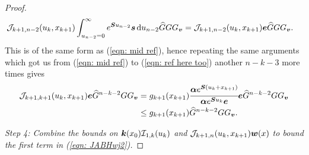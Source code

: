 \begin{proof}
	\begin{align}
		\mathcal J_{k+1,n-2}(u_k,x_{k+1}) \int_{u_{n-2}=0}^\infty e^{\boldsymbol{S}u_{n-2}}\boldsymbol s \, \mathrm{d} u_{n-2} \widehat G G G_{\boldsymbol v}
		&= \mathcal J_{k+1,n-2}(u_k,x_{k+1}) \boldsymbol e \widehat G G G_{\boldsymbol v}. \label{eqn: ref here too}
	\end{align} 
	This is of the same form as (\ref{eqn: mid ref}), hence repeating the same arguments which got us from (\ref{eqn: mid ref}) to (\ref{eqn: ref here too}) another \(n-k-3\) more times gives
	 \begin{align*}
		\mathcal J_{k+1,k+1}(u_k,x_{k+1}) \boldsymbol e  \widehat G^{n-k-2}G G_{\boldsymbol v}
		&= g_{k+1}(x_{k+1}) \cfrac{\boldsymbol\alpha e^{\boldsymbol{S}(u_k+x_{k+1})}}{\boldsymbol \alpha e^{\boldsymbol{S}u_k}\boldsymbol e} \boldsymbol e\widehat G^{n-k-2}G G_{\boldsymbol v}
		\\& \leq g_{k+1}(x_{k+1}) \widehat G^{n-k-2}G G_{\boldsymbol v}.
	\end{align*} 

\emph{Step 4: Combine the bounds on \(\boldsymbol k(x_0)\mathcal I_{1,k}(u_k) \) and \(\mathcal J_{k+1,n}(u_k,x_{k+1})  {\boldsymbol w}(x)\) to bound the first term in (\ref{eqn: JABHwj2}).}	


\end{proof}

